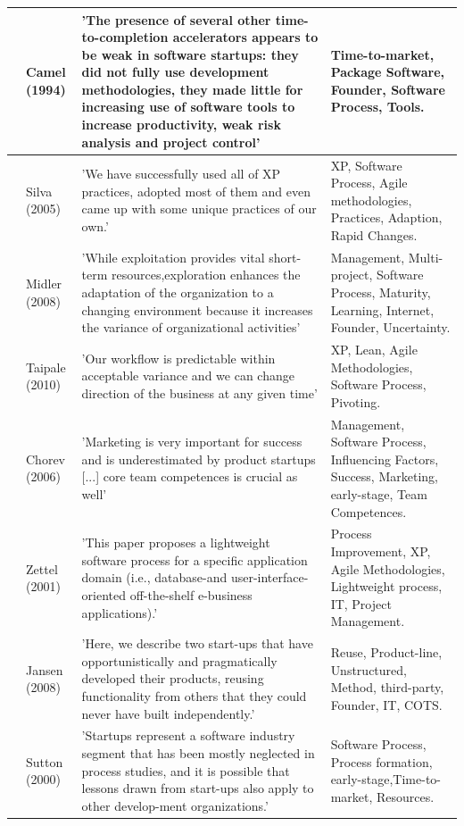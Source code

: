 \documentclass[final,5p,times,twocolumn]{elsarticle}
\begin{document}
\begin{longtable}{|p{0.2in}|p{0.8in}|p{2.5in}|p{1.4in}|}
\cite{Camel1994a} & Camel (1994) & 'The presence of several other time-to-completion accelerators appears to be weak in software startups: they did not fully use development methodologies, they made little for increasing use of software tools to increase productivity, weak risk analysis and project control' & Time-to-market, Package Software, Founder, Software Process, Tools. \\ \hline 
\cite{Silva2005} & Silva (2005) & 'We have successfully used all of XP practices, adopted most of them and even came up with some unique practices of our own.' & XP, Software Process, Agile methodologies, Practices, Adaption, Rapid Changes. \\ \hline 
\cite{Midler2008} & Midler (2008) & 'While exploitation provides vital short-term resources,exploration enhances the adaptation of the organization to a changing environment because it increases the variance of organizational activities' & Management, Multi-project, Software Process, Maturity, Learning, Internet, Founder, Uncertainty. \\ \hline 
\cite{Taipale2010} & Taipale (2010) & 'Our workflow is predictable within acceptable variance and we can change direction of the business at any given time'  & XP, Lean, Agile Methodologies, Software Process, Pivoting. \\ \hline 
\cite{Chorev2006} & Chorev (2006) & 'Marketing is very important for success and is underestimated by product startups [...] core team competences is crucial as well' & Management, Software Process, Influencing Factors, Success, Marketing, early-stage, Team Competences. \\ \hline 
\cite{Zettel2001} & Zettel (2001) & 'This paper proposes a lightweight software process for a specific application domain (i.e., database-and user-interface-oriented off-the-shelf e-business applications).' & Process Improvement, XP, Agile Methodologies, Lightweight process, IT, Project Management. \\ \hline 
\cite{Jansen2008} & Jansen (2008) & 'Here, we describe two start-ups that have opportunistically and pragmatically developed their products, reusing functionality from
others that they could never have built independently.' & Reuse, Product-line, Unstructured, Method, third-party, Founder, IT, COTS. \\ \hline 
\cite{Sutton2000} & Sutton (2000) & 'Startups represent a software industry segment that has been mostly neglected in process studies, and it is possible that lessons drawn from start-ups also apply to other develop-ment organizations.' & Software Process, Process formation,  early-stage,Time-to-market, Resources. \\ \hline 

\end{longtable}
\end{document}
